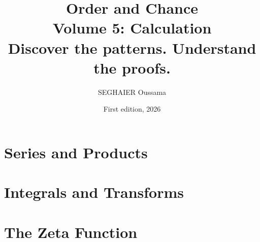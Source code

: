 \documentclass[11pt,openany]{book}
\title{\Huge\textbf{Order and Chance}\\[0.4em]\LARGE Volume 5: Calculation\\[0.6em]
\Large Discover the patterns. Understand the proofs.}
\author{SEGHAIER Oussama}
\date{First edition, 2026}
\begin{document}
\frontmatter
\makecover
\maketitle

\tableofcontents

\mainmatter

\part{Series and Products}



\part{Integrals and Transforms}






\part{The Zeta Function}



\end{document}
